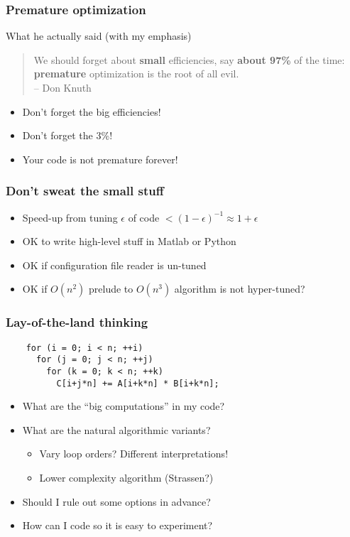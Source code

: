 \documentclass{beamer}
\begin{document}
\begin{frame}
  \frametitle{Premature optimization}

  What he actually said (with my emphasis)
  \begin{quote}
  We should forget about {\bf small} efficiencies, say {\bf about 97\%} of the
  time: {\bf premature} optimization is the root of all evil. \\
  \hfill -- Don Knuth
  \end{quote}

  \begin{itemize}
  \item Don't forget the big efficiencies!
  \item Don't forget the 3\%!
  \item Your code is not premature forever!
  \end{itemize}
\end{frame}


\begin{frame}
  \frametitle{Don't sweat the small stuff}

  \begin{itemize}
  \item Speed-up from tuning $\epsilon$ of code $< (1-\epsilon)^{-1}
    \approx 1 + \epsilon$
  \item OK to write high-level stuff in Matlab or Python
  \item OK if configuration file reader is un-tuned
  \item OK if $O(n^2)$ prelude to $O(n^3)$ algorithm is not hyper-tuned?
  \end{itemize}
\end{frame}


\begin{frame}[fragile]
  \frametitle{Lay-of-the-land thinking}

  \begin{lstlisting}
    for (i = 0; i < n; ++i)
      for (j = 0; j < n; ++j)
        for (k = 0; k < n; ++k)
          C[i+j*n] += A[i+k*n] * B[i+k*n];
  \end{lstlisting}
  \begin{itemize}
  \item What are the ``big computations'' in my code?
  \item What are the natural algorithmic variants?
    \begin{itemize}
    \item Vary loop orders?  Different interpretations!
    \item Lower complexity algorithm (Strassen?)
    \end{itemize}
  \item Should I rule out some options in advance?
  \item How can I code so it is easy to experiment?
  \end{itemize}
\end{frame}
\end{document}
